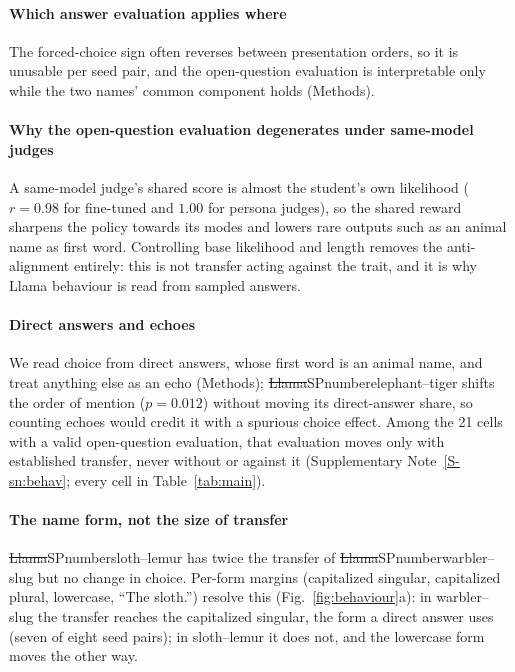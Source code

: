 


\paragraph{Which answer evaluation applies where} The forced-choice sign often reverses between presentation orders\cite{wang2024fair}, so it is unusable per seed pair, and the open-question evaluation is interpretable only while the two names' common component holds (Methods).

\paragraph{Why the open-question evaluation degenerates under same-model judges} A same-model judge's shared score is almost the student's own likelihood\cite{panickssery2024llm,wataoka2024selfpreference} ($r = 0.98$ for fine-tuned and $1.00$ for persona judges), so the shared reward sharpens the policy towards its modes\cite{huang2025sharpening} and lowers rare outputs such as an animal name as first word. Controlling base likelihood and length removes the anti-alignment entirely: this is not transfer acting against the trait, and it is why Llama behaviour is read from sampled answers.

\paragraph{Direct answers and echoes} We read choice from direct answers, whose first word is an animal name, and treat anything else as an echo (Methods); \st{Llama}{SP}{number}{elephant--tiger} shifts the order of mention ($p = 0.012$) without moving its direct-answer share, so counting echoes would credit it with a spurious choice effect. Among the 21 cells with a valid open-question evaluation, that evaluation moves only with established transfer, never without or against it (Supplementary Note~\ref{S-sn:behav}; every cell in Table~\ref{tab:main}).

\paragraph{The name form, not the size of transfer} \st{Llama}{SP}{number}{sloth--lemur} has twice the transfer of \st{Llama}{SP}{number}{warbler--slug} but no change in choice. Per-form margins (capitalized singular, capitalized plural, lowercase, ``The sloth.'') resolve this (Fig.~\ref{fig:behaviour}a): in warbler--slug the transfer reaches the capitalized singular, the form a direct answer uses (seven of eight seed pairs); in sloth--lemur it does not, and the lowercase form moves the other way.

